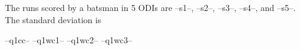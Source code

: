 \question The runs scored by a batsman in 5 ODIs are --s1--, --s2--, --s3--, --s4--, and --s5--. The standard deviation is


\begin{randomizechoices}
\correctchoice --q1cc-- 
\choice --q1wc1--  
\choice --q1wc2-- 
\choice --q1wc3-- 
\end{randomizechoices}

